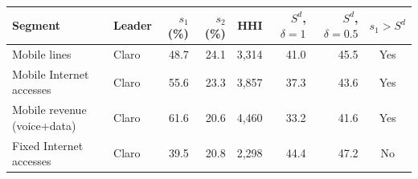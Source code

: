 \begin{tabular}{llrrrrrc}
\toprule
Segment & Leader & $s_1$ (\%) & $s_2$ (\%) & HHI & $S^d$, $\delta{=}1$ & $S^d$, $\delta{=}0.5$ & $s_1>S^d$ \\
\midrule
Mobile lines & Claro & 48.7 & 24.1 & 3,314 & 41.0 & 45.5 & Yes \\
Mobile Internet accesses & Claro & 55.6 & 23.3 & 3,857 & 37.3 & 43.6 & Yes \\
Mobile revenue (voice+data) & Claro & 61.6 & 20.6 & 4,460 & 33.2 & 41.6 & Yes \\
Fixed Internet accesses & Claro & 39.5 & 20.8 & 2,298 & 44.4 & 47.2 & No \\
\bottomrule
\end{tabular}
